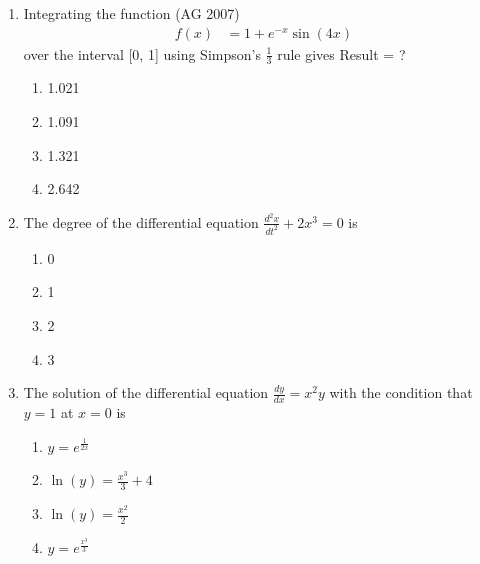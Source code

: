 \begin{enumerate}[label=\thesubsection.\arabic*,ref=\thesubsection.\theenumi]
\begin{align*}
\frac{dy}{dx} &= 2xy + 1
\end{align*}
gives the value of
$y(0.3)  =  $?
\hfill(AG 2007)
\begin{multicols}{4}
\begin{enumerate}
    \item 0.3101
    \item 0.3142
    \item 0.6202
    \item 4.080
\end{enumerate}
\end{multicols}
\item Integrating the function
\hfill(AG 2007)
\begin{align*}
f(x) &= 1 + e^{-x} \sin(4x)
\end{align*}
over the interval [0, 1] using Simpson's $\frac{1}{3}$ rule gives Result =  ?
\begin{multicols}{4}
\begin{enumerate}
    \item 1.021
    \item 1.091
    \item 1.321
    \item 2.642
\end{enumerate}
\end{multicols}
\item The degree of the differential equation $\frac{d^2x}{dt^2}+2x^3=0$ is
\hfill{}
\begin{multicols}{4}
\begin{enumerate}
\item 0
\item 1
\item 2
\item 3
\end{enumerate}
\end{multicols}

\item The solution of the differential equation $\frac{dy}{dx}=x^2y$ with the condition that $y=1$ at $x=0$ is
\hfill{}
\begin{multicols}{4}
\begin{enumerate}
\item $y=e^{\frac{1}{2x}}$
\item $\ln(y)=\frac{x^3}{3}+4$
\item $\ln(y)=\frac{x^2}{2}$
\item $y=e^{\frac{x^3}{3}}$
\end{enumerate}
\end{multicols}


\end{enumerate}
